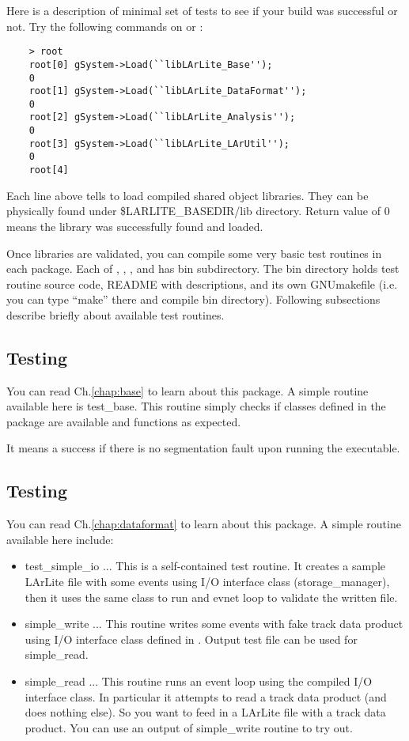 
Here is a description of minimal set of tests to see if your build was successful or not. Try the following commands on \CINT or \PyROOT:
\begin{lstlisting}
    > root
    root[0] gSystem->Load(``libLArLite_Base'');
    0
    root[1] gSystem->Load(``libLArLite_DataFormat'');
    0
    root[2] gSystem->Load(``libLArLite_Analysis'');
    0
    root[3] gSystem->Load(``libLArLite_LArUtil'');
    0
    root[4] 
\end{lstlisting}
Each line above tells \CINT to load compiled shared object libraries. They can be physically found under {\ttfamily \$LARLITE\_BASEDIR/lib} directory. Return value of 0 means the library was successfully found and loaded.

Once libraries are validated, you can compile some very basic test routines in each package.
Each of \Base, \DataFormat, \Analysis, and \LArUtil has {\ttfamily bin} subdirectory. 
The {\ttfamily bin} directory holds test routine source code, README with descriptions, and 
its own GNUmakefile (i.e. you can type ``make'' there and compile {\ttfamily bin} directory). 
Following subsections describe briefly about available test routines.

\subsection{Testing \Base}
You can read Ch.\ref{chap:base} to learn about this package.
A simple routine available here is {\ttfamily test\_base}. This routine simply checks if \CPP
classes defined  in the package are available and functions as expected. 

It means a success if there is no segmentation fault upon running the executable.

\subsection{Testing \DataFormat}
You can read Ch.\ref{chap:dataformat} to learn about this package.
A simple routine available here include:
\begin{itemize}
\item {\ttfamily test\_simple\_io} ... This is a self-contained test routine. It creates a sample LArLite
\ROOT file with some events using I/O interface class ({\ttfamily storage\_manager}), then
it uses the same class to run and evnet loop to validate the written file. 
\item {\ttfamily simple\_write} ... This routine writes some events with fake track data product using 
I/O interface class defined in \DataFormat. Output test file can be used for {\ttfamily simple\_read}.
\item {\ttfamily simple\_read} ... This routine runs an event loop using the compiled I/O interface class.
In particular it attempts to read a track data product (and does nothing else). So you want to feed in
a LArLite \ROOT file with a track data product. You can use an output of {\ttfamily simple\_write} routine
to try out.                                       
\end{itemize}

